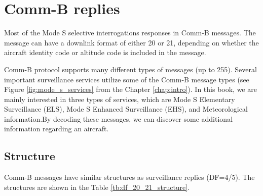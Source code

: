 \chapter{Comm-B replies} \label{chap:comm-b}

Most of the Mode S selective interrogations responses in Comm-B messages. The message can have a downlink format of either 20 or 21, depending on whether the aircraft identity code or altitude code is included in the message.

Comm-B protocol supports many different types of messages (up to 255). Several important surveillance services utilize some of the Comm-B message types (see Figure \ref{fig:mode_s_services} from the Chapter \ref{chap:intro}). In this book, we are mainly interested in three types of services, which are Mode S Elementary Surveillance (ELS), Mode S Enhanced Surveillance (EHS), and Meteorological information.By decoding these messages, we can discover some additional information regarding an aircraft.


\section{Structure}

Comm-B messages have similar structures as surveillance replies (DF=4/5). The structures are shown in the Table \ref{tb:df_20_21_structure}.

